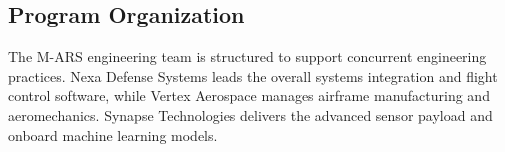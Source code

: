 \subsection{Program Organization}
The M-ARS engineering team is structured to support concurrent engineering practices. Nexa Defense Systems leads the overall systems integration and flight control software, while Vertex Aerospace manages airframe manufacturing and aeromechanics. Synapse Technologies delivers the advanced sensor payload and onboard machine learning models.

